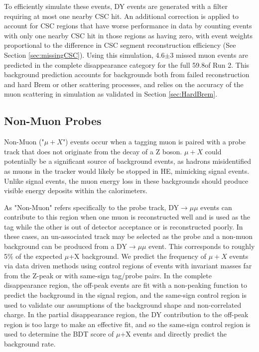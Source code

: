 To efficiently simulate these events, DY events are generated with a filter requiring at most one nearby CSC hit. An additional correction is applied to account for CSC regions that have worse performance in data by counting events with only one nearby CSC hit in those regions as having zero, with event weights proportional to the difference in CSC segment reconstruction efficiency (See Section \ref{sec:missingCSC}). Using this simulation, 4.6$\pm$3 missed muon events are predicted in the complete disappearance category for the full 59.8\fbinv of Run 2. This background prediction accounts for backgrounds both from failed reconstruction and hard Brem or other scattering processes, and relies on the accuracy of the muon scattering in simulation as validated in Section \ref{sec:HardBrem}.

\subsection{Non-Muon Probes}
Non-Muon ("$\mu+X$") events occur when a tagging muon is paired with a probe track that does not originate from the decay of a Z boson. $\mu+X$ could potentially be a significant source of background events, as hadrons misidentified as muons in the tracker would likely be stopped in HE, mimicking signal events. Unlike signal events, the muon energy loss in these backgrounds should produce visible energy deposits within the calorimeters.

As "Non-Muon" refers specifically to the probe track, DY$\rightarrow\mu\mu$ events can contribute to this region when one muon is reconstructed well and is used as the tag while the other is out of detector acceptance or is reconstructed poorly. In these cases, an un-associated track may be selected as the probe and a non-muon background can be produced from a DY$\rightarrow\mu\mu$ event. This corresponds to roughly 5$\%$ of the expected $\mu$+X background.
We predict the frequency of $\mu+X$ events via data driven methods using control regions of events with invariant masses far from the Z-peak or with same-sign tag/probe pairs.
In the complete disappearance region, the off-peak events are fit with a non-peaking function to predict the background in the signal region, and the same-sign control region is used to validate our assumptions of the background shape and non-correlated charge.
In the partial disappearance region, the DY contribution to the off-peak region is too large to make an effective fit, and so the same-sign control region is used to determine the BDT score of $\mu$+X events and directly predict the background rate.

